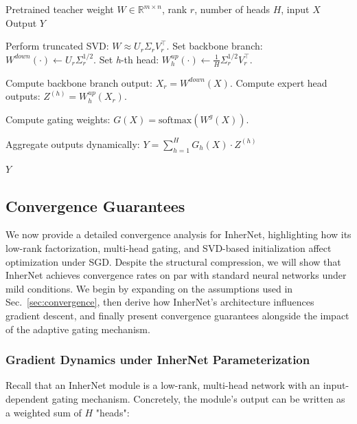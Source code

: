 \documentclass{article} %
\begin{document}
\begin{algorithm}[!htbp]
    \caption{InherNet: SVD-Driven Neural Network Inheritance}
    \label{alg:inhernet}
    \begin{algorithmic}[1]
        \REQUIRE Pretrained teacher weight \(W \in \mathbb{R}^{m \times n}\), rank \(r\), number of heads \(H\), input \(X\)
        \ENSURE Output \(Y\)

        \STATE Perform truncated SVD: \(W \approx U_r\Sigma_r V_r^\top\).
        \STATE Set backbone branch: \(W^{down}(\cdot)\leftarrow U_r \Sigma_r^{1/2}\).
            \STATE Set \textit{h}-th head: \(W^{up}_{h}(\cdot)\leftarrow \frac{1}{H} \Sigma_r^{1/2} V_r^\top\).
        \ENDFOR

        \STATE Compute backbone branch output: \(X_r = W^{down}(X)\).
            \STATE Compute expert head outputs: \(Z^{(h)} = W^{up}_h(X_r)\).
        \ENDFOR

        \STATE Compute gating weights: \(G(X)=\text{softmax}\left(W^g(X)\right)\).

        \STATE Aggregate outputs dynamically: \(Y=\sum_{h=1}^{H}G_h(X)\cdot Z^{(h)}\)


        \RETURN \(Y\)
    \end{algorithmic}
\end{algorithm}


\subsection{Convergence Guarantees}
\label{app:convergence}
We now provide a detailed convergence analysis for InherNet, highlighting how its low-rank factorization, multi-head gating, and SVD-based initialization affect optimization under SGD. Despite the structural compression, we will show that InherNet achieves convergence rates on par with standard neural networks under mild conditions. We begin by expanding on the assumptions used in Sec.~\ref{sec:convergence}, then derive how InherNet's architecture influences gradient descent, and finally present convergence guarantees alongside the impact of the adaptive gating mechanism.

\subsubsection{Gradient Dynamics under InherNet Parameterization}

Recall that an InherNet module is a low-rank, multi-head network with an input-dependent gating mechanism. Concretely, the module's output can be written as a weighted sum of $H$ "heads":
\end{document}
